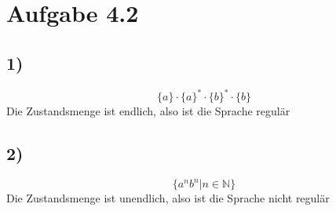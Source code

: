 \section*{Aufgabe 4.2}
\subsection*{1)}
\[\{a\}\cdot\{a\}^*\cdot\{b\}^*\cdot\{b\}\]
Die Zustandsmenge ist endlich, also ist die Sprache regulär
\subsection*{2)}
\[\{a^nb^n|n\in\mathbb{N}\}\]
Die Zustandsmenge ist unendlich, also ist die Sprache nicht regulär
